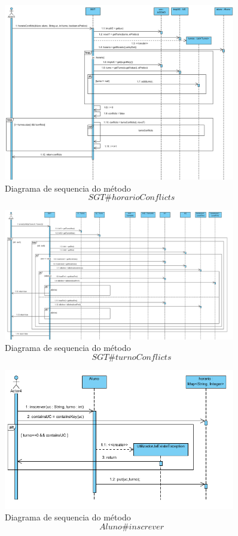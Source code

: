 \documentclass[12pt,a4paper]{report}
\begin{document}
\begin{figure}[H]
	\centering 
	\includegraphics[width=0.9\textwidth]{modelacao/diagramas_de_sequencia/assignShifts/horarioConflicts.png}
	\caption{Diagrama de sequencia do método $$SGT\#horarioConflicts$$}
	\label{fig:horarioConflicts}
\end{figure}
\begin{figure}[H]
	\centering 
	\includegraphics[width=0.9\textwidth]{modelacao/diagramas_de_sequencia/assignShifts/turnoConflicts.png}
	\caption{Diagrama de sequencia do método $$SGT\#turnoConflicts$$}
	\label{fig:turnoConflicts}
\end{figure}
\begin{figure}[H]
	\centering 
	\includegraphics[width=0.9\textwidth]{modelacao/diagramas_de_sequencia/assignShifts/inscrever.png}
	\caption{Diagrama de sequencia do método $$Aluno\#inscrever$$}
	\label{fig:inscrever}
\end{figure}
\end{document}
